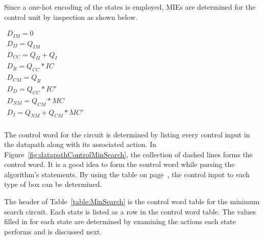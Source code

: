 Since a one-hot encoding of the states is employed, MIEs are determined
for the control unit by inspection as shown below.

$
\begin{array}{l}
    D_{IM} = 0 \\
    D_{II} = Q_{IM} \\
    D_{CC} = Q_{II} + Q_{I} \\
    D_{R}  = Q_{CC} * IC \\
    D_{CM} = Q_{R}  \\
    D_{D}  = Q_{CC} * IC' \\
    D_{NM} = Q_{CM} * MC \\
    D_{I}  = Q_{NM} + Q_{CM}*MC' \\
\end{array}$

The control word for the circuit is determined by listing every control
input in the datapath along with its associated action.  In
Figure~\ref{fig:datapathControlMinSearch}, the collection of dashed lines forms the
control word.  It is a good idea to form the control word while parsing
the algorithm's statements.  By using the table on
page~\pageref{page:boxlist}, the control input to each
type of box can be determined.

The header of Table~\ref{table:MinSearch} is the control word table for
the minimum search circuit. Each state is listed as a row in the control
word table.  The values filled in for each state are determined by examining
the actions each state performs and is discussed next.

